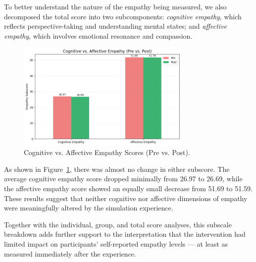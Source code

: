 To better understand the nature of the empathy being measured, we also decomposed the total score into two subcomponents: \textit{cognitive empathy}, which reflects perspective-taking and understanding mental states; and \textit{affective empathy}, which involves emotional resonance and compassion.

\begin{figure}[htbp]
    \centering
    \includegraphics[width=0.75\textwidth]{../../Figures/cog-vs-affect.png}
    \caption{Cognitive vs. Affective Empathy Scores (Pre vs. Post).}
    \label{fig:empathy_cog_aff}
\end{figure}

As shown in Figure~\ref{fig:empathy_cog_aff}, there was almost no change in either subscore. The average cognitive empathy score dropped minimally from 26.97 to 26.69, while the affective empathy score showed an equally small decrease from 51.69 to 51.59. These results suggest that neither cognitive nor affective dimensions of empathy were meaningfully altered by the simulation experience.

Together with the individual, group, and total score analyses, this subscale breakdown adds further support to the interpretation that the intervention had limited impact on participants' self-reported empathy levels — at least as measured immediately after the experience.



